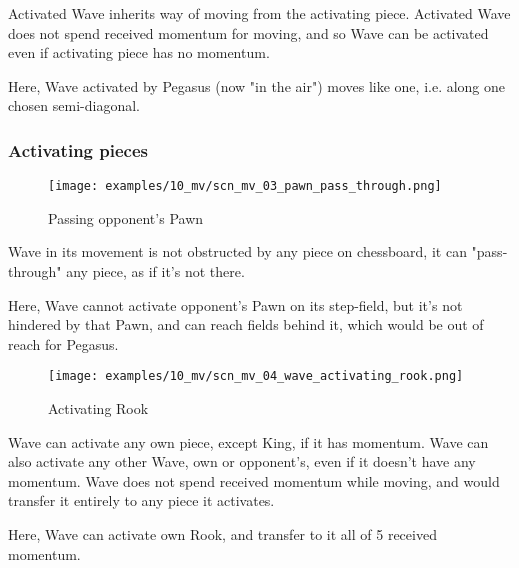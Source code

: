 Activated Wave inherits way of moving from the activating piece. Activated Wave
does not spend received momentum for moving, and so Wave can be activated even if
activating piece has no momentum.

Here, Wave activated by Pegasus (now "in the air") moves like one, i.e. along one
chosen semi-diagonal.

\clearpage %

\subsubsection*{Activating pieces}

\vspace*{-1.4\baselineskip}
\noindent
\begin{figure}[!h]
\texttt{[image: examples/10\_mv/scn\_mv\_03\_pawn\_pass\_through.png]}
\caption{Passing opponent's Pawn}
\label{fig:scn_mv_03_pawn_pass_through}
\end{figure}

Wave in its movement is not obstructed by any piece on chessboard, it can
"pass-through" any piece, as if it's not there.

Here, Wave cannot activate opponent's Pawn on its step-field, but it's not
hindered by that Pawn, and can reach fields behind it, which would be out of
reach for Pegasus.

\clearpage %

\vspace*{-2.1\baselineskip}
\noindent
\begin{figure}[!h]
\texttt{[image: examples/10\_mv/scn\_mv\_04\_wave\_activating\_rook.png]}
\caption{Activating Rook}
\label{fig:scn_mv_04_wave_activating_rook}
\end{figure}

Wave can activate any own piece, except King, if it has momentum. Wave can also
activate any other Wave, own or opponent's, even if it doesn't have any momentum.
Wave does not spend received momentum while moving, and would transfer it entirely
to any piece it activates.

Here, Wave can activate own Rook, and transfer to it all of 5 received momentum.

\clearpage %

